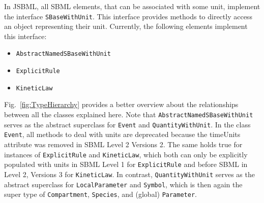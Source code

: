 \documentclass[
  BCOR12mm,
  letterpaper,
  11pt,
  headsepline,
  pointlessnumbers,
  tablecaptionabove,
  onelinecaption,
  headinclude,
  appendixprefix,
  idxtotoc,
  bibtotoc,
  twoside,
  titlepage
]{scrartcl}
\begin{document}
In JSBML, all SBML elements, that can be associated with some unit, implement
the interface \texttt{SBaseWithUnit}.
This interface provides methods to directly
access an object representing their unit. Currently, the following elements
implement this interface:
\begin{itemize}
 \item \texttt{AbstractNamedSBaseWithUnit}
 \item \texttt{ExplicitRule}
 \item \texttt{KineticLaw}
\end{itemize}
Fig.~\vref{fig:TypeHierarchy} provides a better overview about the relationships
between all the classes explained here. Note that
\texttt{AbstractNamedSBaseWithUnit} serves as the abstract superclass for
\texttt{Event} and \texttt{QuantityWithUnit}.
In the class \texttt{Event}, all methods
to deal with units are deprecated because the timeUnits attribute
was removed in SBML Level 2 Versions 2. The same holds true
for instances of
\texttt{ExplicitRule}
and \texttt{KineticLaw},
which both can only be explicitly populated with units in SBML Level
1 for \texttt{ExplicitRule} and before SBML in Level 2,
Versions 3 for \texttt{KineticLaw}. In contrast,
\texttt{QuantityWithUnit}
serves as the abstract superclass for \texttt{LocalParameter}
 and
\texttt{Symbol},
which is then again the super type of \texttt{Compartment}, \texttt{Species}, and (global) \texttt{Parameter}.
\end{document}
